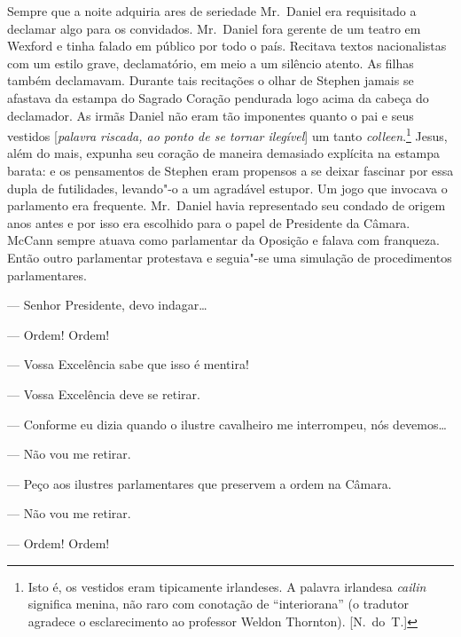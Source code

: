 Sempre que a noite adquiria ares de seriedade Mr.~Daniel era
requisitado a declamar algo para os convidados.  Mr.~Daniel fora
gerente de um teatro em Wexford e tinha \label{falado"-em} falado em público por todo o
país.  Recitava textos nacionalistas com um estilo grave, declamatório,
em meio a um silêncio atento.  As filhas também declamavam.  Durante
tais recitações o olhar de Stephen jamais se afastava da estampa do
Sagrado Coração pendurada logo acima da cabeça do declamador.  As irmãs
Daniel não eram tão imponentes quanto o pai e seus vestidos
[\textit{palavra riscada, ao ponto de se tornar ilegível}] um tanto
\textit{colleen}.\footnote{ Isto é, os vestidos eram tipicamente
irlandeses.  A palavra irlandesa \textit{cailin} significa menina, não
raro com conotação de “interiorana” (o tradutor agradece o
esclarecimento ao professor Weldon Thornton). [N.~do~T.]}  \label{jesus} Jesus, além
do mais, expunha seu coração de maneira demasiado explícita na estampa
barata: e os pensamentos de Stephen eram propensos a se deixar fascinar
por essa dupla de futilidades, levando"-o a um agradável estupor.  Um
jogo que invocava o parlamento era frequente.  Mr.~Daniel havia
representado seu condado de origem anos antes e por isso era escolhido
para o papel de Presidente da Câmara.  McCann sempre atuava como
parlamentar da Oposição e falava com franqueza.  Então outro
parlamentar protestava e seguia"-se uma simulação de procedimentos
parlamentares.

--- Senhor Presidente, devo indagar\ldots{}

--- Ordem!  Ordem!

--- Vossa Excelência sabe que isso é mentira!

--- Vossa Excelência deve se retirar.

--- Conforme eu dizia quando o ilustre cavalheiro me interrompeu,
nós devemos\ldots{}

--- Não vou me retirar.

--- Peço aos ilustres parlamentares que preservem a ordem na
Câmara.

--- Não vou me retirar.

--- Ordem!  Ordem!

